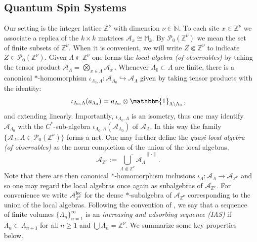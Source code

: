 \documentclass{article}
\newcommand{\one}{\mathbbm{1}}
\newcommand{\Znu}{\mathbb{Z}^\nu}
\newcommand{\A}{\mathcal{A}}
\newcommand{\M}{\mathbb{M}}
\newcommand{\N}{\mathbb N}
\DeclareMathOperator{\loc}{loc}
\newcommand{\<}{\langle}
\renewcommand{\>}{\rangle}
\newcommand{\Alambda}{\mathcal{A}_{\Lambda}}
\theoremstyle{definition}
\numberwithin{equation}{section}
\begin{document}
\subsection{Quantum Spin Systems}
Our setting is the integer lattice $\Znu$ with dimension $\nu\in \N$. To each site $x\in \Znu$ we associate a replica of the $k\times k$ matrices $\mathcal{A}_x\cong \M_k$. By $\mathscr{P}_0(\Znu)$ we mean the set of finite subsets of $\Znu$. When it is convenient, we will write $Z\Subset \Znu$ to indicate $Z\in \mathscr{P}_0(\Znu)$. Given $\Lambda \Subset \Znu$ one forms the \emph{local algebra (of observables)} by taking the tensor product $\Alambda = \bigotimes_{x\in \Lambda} \mathcal{A}_x\,.$ Whenever $\Lambda_0 \subset \Lambda$ are finite, there is a canonical $*$-homomorphism $\iota_{\Lambda_0, \Lambda} : \A_{\Lambda_0} \hookrightarrow \A_{\Lambda}$ given by taking tensor products with the identity:
\[
    \iota_{\Lambda_0, \Lambda}(a_{\Lambda_0}) = a_{\Lambda_0} \otimes \one_{\Lambda \setminus \Lambda_0}\,,
\] and extending linearly. Importantly, $\iota_{\Lambda_0,\Lambda}$ is an isometry, thus one may identify $\A_{\Lambda_0}$ with the $C^*$-sub-algebra $\iota_{\Lambda_0, \Lambda}(\A_{\Lambda_0})$ of $\A_{\Lambda}$. In this way the family $\{\A_{\Lambda} \colon \Lambda \in \mathscr{P}_0(\Znu)\}$ forms a net. One may further define the \emph{quasi-local algebra (of observables)} as the norm completion of the union of the local algebras, 
\[
    \A_{\Znu} := \overline{\bigcup_{\Lambda \Subset \Znu} \A_{\Lambda}}^{\|\cdot \|}\,.
\] Note that there are then canonical $*$-homomorphism inclusions $\iota_{\Lambda}:\A_{\Lambda} \to \A_{\Znu}$ and so one may regard the local algebras once again as subalgebras of $\A_{\Znu}$. For convenience we write $\A_{\Znu}^{\loc}$ for the dense $*$-subalgebra of $\A_{\Znu}$ corresponding to the union of the local algebras. Following the convention of \cite{NachtergaeleSimsYoung, NachtergaeleSimsYoung_2, NachtergaeleSimsYoung_bulk}, we say that a sequence of finite volumes $\{\Lambda_n\}_{n=1}^\infty$ is an \emph{increasing and adsorbing sequence (IAS)} if $\Lambda_n \subset \Lambda_{n+1}$ for all $n\ge 1$ and $\bigcup \Lambda_n = \Znu$. We summarize some key properties below. 
\end{document}
